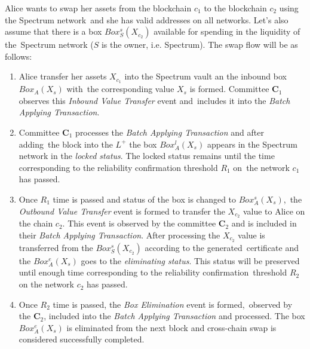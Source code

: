 Alice wants to swap her assets from the blockchain $c_1$ to the blockchain $c_2$ using the Spectrum network\
and she has valid addresses on all networks.
Let's also assume that there is a box ${Box_{S}^s(X_{c_2})}$ available for spending in the liquidity of the\
Spectrum network ($S$ is the owner, i.e. Spectrum).
The swap flow will be as follows:
\begin{enumerate}

    \item Alice transfer her assets $X_{c_1}$ into the Spectrum vault an the inbound box ${Box_{A}(X_s)}$ with\
    the corresponding value $X_s$ is formed.
    Committee $\mathbf{C}_1$ observes this \textit{Inbound Value Transfer} event and\
    includes it into the \textit{Batch Applying Transaction}.

    \item Committee $\mathbf{C}_1$ processes the \textit{Batch Applying Transaction} and after adding\
    the block into the $L^+$ the box $Box_{A}^l(X_s)$ appears in the Spectrum network in the \textit{locked status}.
    The locked status remains until the time corresponding to the reliability confirmation threshold $R_1$ on\
    the network $c_1$ has passed.

    \item Once $R_1$ time is passed and status of the box is changed to $Box_{A}^s(X_s)$,\
    the \textit{Outbound Value Transfer} event is formed to transfer the $X_{c_2}$ value to Alice on the chain $c_2$.
    This event is observed by the committee $\mathbf{C}_2$ and is included in their \textit{Batch Applying Transaction}.
    After processing the $X_{c_2}$ value is transferred from the ${Box_{S}^s(X_{c_2})}$ according to the generated\
    certificate and the $Box_{A}^e(X_s)$ goes to the \textit{eliminating status}.
    This status will be preserved until enough time corresponding to the reliability confirmation\
    threshold $R_2$ on the network $c_2$ has passed.

    \item Once $R_2$ time is passed, the \textit{Box Elimination} event is formed,\
    observed by the $\mathbf{C}_2$, included into the \textit{Batch Applying Transaction} and processed.
    The box $Box_{A}^e(X_s)$ is eliminated from the next block and cross-chain swap is considered successfully completed.

\end{enumerate}

